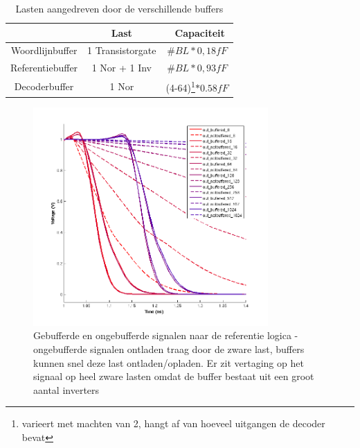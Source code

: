 \begin{table}
\begin{center}
\begin{tabular}{ccc}
\hline
 &  Last & \ Capaciteit\\
\hline
Woordlijnbuffer & 1 Transistorgate &  $\#BL*0,18fF$\\
Referentiebuffer & 1 Nor + 1 Inv &  $\#BL*0,93fF$\\
Decoderbuffer & 1 Nor & (4-64)\footnote{varieert met machten van 2, hangt af van hoeveel uitgangen de decoder bevat}$*0.58fF$\\
\hline
\end{tabular}
\end{center}
\caption[Lasten aangedreven door de verschillende buffers]{Lasten aangedreven door de verschillende buffers}
\label{tab:buffer}
\end{table}

\begin{figure}[!ht]
  \centering
  \includegraphics[width=0.8\textwidth]{../fig/hfdst-buffers-refbuffer.png}
  \caption[Gebufferde en ongebufferde signalen naar de referentie logica]{Gebufferde en ongebufferde signalen naar de referentie logica - ongebufferde signalen ontladen traag door de zware last, buffers kunnen snel deze last ontladen/opladen. Er zit vertaging op het signaal op heel zware lasten omdat de buffer bestaat uit een groot aantal inverters}
  \label{fig:refbuffer}
\end{figure}

